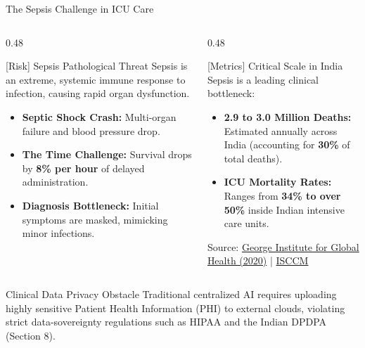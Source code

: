 \documentclass[aspectratio=169, 11pt]{beamer}
\begin{document}
\begin{frame}{The Sepsis Challenge in ICU Care}
    \begin{columns}[t]
        \begin{column}{0.48\textwidth}
            \begin{block}{\textcolor{neonRose}{[Risk]} Sepsis Pathological Threat}
                \scriptsize
                Sepsis is an extreme, systemic immune response to infection, causing rapid organ dysfunction.
                \begin{itemize}
                    \item \textbf{Septic Shock Crash:} Multi-organ failure and blood pressure drop.
                    \item \textbf{The Time Challenge:} Survival drops by \textbf{8\% per hour} of delayed administration.
                    \item \textbf{Diagnosis Bottleneck:} Initial symptoms are masked, mimicking minor infections.
                \end{itemize}
            \end{block}
        \end{column}
        
        \begin{column}{0.48\textwidth}
            \begin{block}{\textcolor{neonAmber}{[Metrics]} Critical Scale in India}
                \scriptsize
                Sepsis is a leading clinical bottleneck:
                \begin{itemize}
                    \item \textbf{2.9 to 3.0 Million Deaths:} Estimated annually across India (accounting for \textbf{30\%} of total deaths).
                    \item \textbf{ICU Mortality Rates:} Ranges from \textbf{34\% to over 50\%} inside Indian intensive care units.
                \end{itemize}
                \vspace{0.1cm}
                \tiny Source: \href{https://www.georgeinstitute.org.in/projects/sepsis-in-india-prevalence-study-sips}{\textcolor{neonCyan}{George Institute for Global Health (2020)}} | \href{https://pubmed.ncbi.nlm.nih.gov/30704986/}{\textcolor{neonCyan}{ISCCM}}
            \end{block}
        \end{column}
    \end{columns}
    
    \begin{alertblock}{Clinical Data Privacy Obstacle}
        \scriptsize
        Traditional centralized AI requires uploading highly sensitive Patient Health Information (PHI) to external clouds, violating strict data-sovereignty regulations such as HIPAA and the Indian DPDPA (Section 8).
    \end{alertblock}
\end{frame}
\end{document}
